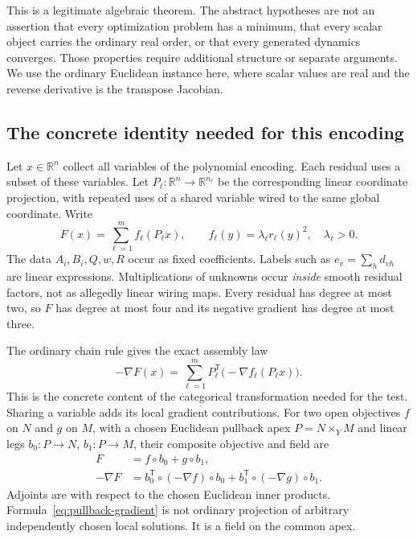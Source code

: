 \documentclass[11pt]{article}
\newcommand{\R}{\mathbb R}
\theoremstyle{remark}
\begin{document}
This is a legitimate algebraic theorem. The abstract hypotheses are not an assertion that every optimization problem has a minimum, that every scalar object carries the ordinary real order, or that every generated dynamics converges. Those properties require additional structure or separate arguments. We use the ordinary Euclidean instance here, where scalar values are real and the reverse derivative is the transpose Jacobian.

\subsection{The concrete identity needed for this encoding}

Let $x\in\R^n$ collect all variables of the polynomial encoding. Each residual uses a subset of these variables. Let $P_\ell:\R^n\to\R^{n_\ell}$ be the corresponding linear coordinate projection, with repeated uses of a shared variable wired to the same global coordinate. Write
\begin{equation}\label{eq:factor-objective}
 F(x)=\sum_{\ell=1}^m f_\ell(P_\ell x),\qquad
 f_\ell(y)=\lambda_\ell r_\ell(y)^2,\quad\lambda_\ell>0.
\end{equation}
The data $A_i,B_i,Q,w,R$ occur as fixed coefficients. Labels such as $e_v=\sum_h d_{vh}$ are linear expressions. Multiplications of unknowns occur \emph{inside} smooth residual factors, not as allegedly linear wiring maps. Every residual has degree at most two, so $F$ has degree at most four and its negative gradient has degree at most three.

The ordinary chain rule gives the exact assembly law
\begin{equation}\label{eq:gradient-assembly}
 -\nabla F(x)=\sum_{\ell=1}^m
 P_\ell^{\mathsf T}\bigl(-\nabla f_\ell(P_\ell x)\bigr).
\end{equation}
This is the concrete content of the categorical transformation needed for the test. Sharing a variable adds its local gradient contributions. For two open objectives $f$ on $N$ and $g$ on $M$, with a chosen Euclidean pullback apex $P=N\times_Y M$ and linear legs $b_0:P\to N$, $b_1:P\to M$, their composite objective and field are
\begin{align}
 F&=f\circ b_0+g\circ b_1,\label{eq:pullback-objective}\\
 -\nabla F&=b_0^{\mathsf T}\circ(-\nabla f)\circ b_0
             +b_1^{\mathsf T}\circ(-\nabla g)\circ b_1.\label{eq:pullback-gradient}
\end{align}
Adjoints are with respect to the chosen Euclidean inner products. Formula~\eqref{eq:pullback-gradient} is not ordinary projection of arbitrary independently chosen local solutions. It is a field on the common apex.
\end{document}
